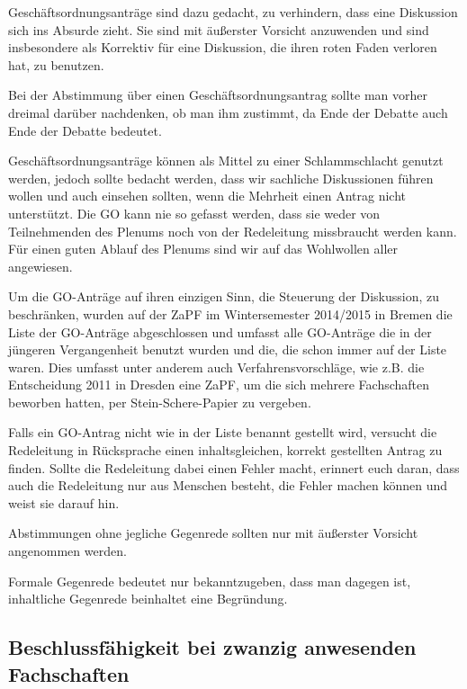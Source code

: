 \documentclass[
  a4paper,
  oneside]{scrartcl}
\begin{document}
Geschäftsordnungsanträge sind dazu gedacht, zu verhindern, dass eine
Diskussion sich ins Absurde zieht. Sie sind mit äußerster Vorsicht
anzuwenden und sind insbesondere als Korrektiv für eine Diskussion, die
ihren roten Faden verloren hat, zu benutzen.

Bei der Abstimmung über einen Geschäftsordnungsantrag sollte man vorher
dreimal darüber nachdenken, ob man ihm zustimmt, da Ende der Debatte
auch Ende der Debatte bedeutet.

Geschäftsordnungsanträge können als Mittel zu einer Schlammschlacht
genutzt werden, jedoch sollte bedacht werden, dass wir sachliche
Diskussionen führen wollen und auch einsehen sollten, wenn die Mehrheit
einen Antrag nicht unterstützt. Die GO kann nie so gefasst werden, dass
sie weder von Teilnehmenden des Plenums noch von der Redeleitung
missbraucht werden kann. Für einen guten Ablauf des Plenums sind wir auf
das Wohlwollen aller angewiesen.

Um die GO-Anträge auf ihren einzigen Sinn, die Steuerung der Diskussion,
zu beschränken, wurden auf der ZaPF im Wintersemester 2014/2015 in
Bremen die Liste der GO-Anträge abgeschlossen und umfasst alle
GO-Anträge die in der jüngeren Vergangenheit benutzt wurden und die, die
schon immer auf der Liste waren. Dies umfasst unter anderem auch
Verfahrensvorschläge, wie z.B. die Entscheidung 2011 in Dresden eine
ZaPF, um die sich mehrere Fachschaften beworben hatten, per
Stein-Schere-Papier zu vergeben.

Falls ein GO-Antrag nicht wie in der Liste benannt gestellt wird,
versucht die Redeleitung in Rücksprache einen inhaltsgleichen, korrekt
gestellten Antrag zu finden. Sollte die Redeleitung dabei einen Fehler
macht, erinnert euch daran, dass auch die Redeleitung nur aus Menschen
besteht, die Fehler machen können und weist sie darauf hin.

Abstimmungen ohne jegliche Gegenrede sollten nur mit äußerster Vorsicht
angenommen werden.

Formale Gegenrede bedeutet nur bekanntzugeben, dass man dagegen ist,
inhaltliche Gegenrede beinhaltet eine Begründung.

\subsection*{Beschlussfähigkeit bei zwanzig anwesenden
Fachschaften}\label{beschlussfuxe4higkeit-bei-zwanzig-anwesenden-fachschaften}
\end{document}
